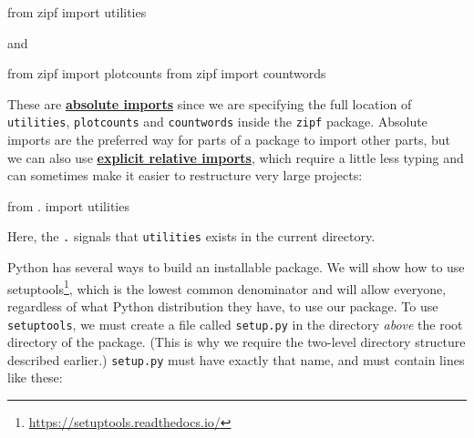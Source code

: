 \documentclass[
]{krantz}
\makeatletter
\newenvironment{Shaded}{\begin{snugshade}}{\end{snugshade}}
\newcommand{\ImportTok}[1]{#1}
\newcommand{\NormalTok}[1]{#1}
\renewcommand{\href}[2]{#2\footnote{\url{#1}}}
\newenvironment{kframe}{%
\medskip{}
\setlength{\fboxsep}{.8em}
 \def\at@end@of@kframe{}%
 \ifinner\ifhmode%
  \def\at@end@of@kframe{\end{minipage}}%
  \begin{minipage}{\columnwidth}%
 \fi\fi%
 \def\FrameCommand##1{\hskip\@totalleftmargin \hskip-\fboxsep
 \colorbox{shadecolor}{##1}\hskip-\fboxsep
     \hskip-\linewidth \hskip-\@totalleftmargin \hskip\columnwidth}%
 \MakeFramed {\advance\hsize-\width
   \@totalleftmargin\z@ \linewidth\hsize
   \@setminipage}}%
 {\par\unskip\endMakeFramed%
 \at@end@of@kframe}
\renewenvironment{Shaded}{\begin{kframe}}{\end{kframe}}
\newcommand{\gref}[2]{\hyperlink{#2}{\textbf{#1}}}
\makeatother
\begin{document}
\begin{Shaded}
\begin{Highlighting}[]
\ImportTok{from}\NormalTok{ zipf }\ImportTok{import}\NormalTok{ utilities}
\end{Highlighting}
\end{Shaded}

and

\begin{Shaded}
\begin{Highlighting}[]
\ImportTok{from}\NormalTok{ zipf }\ImportTok{import}\NormalTok{ plotcounts}
\ImportTok{from}\NormalTok{ zipf }\ImportTok{import}\NormalTok{ countwords}
\end{Highlighting}
\end{Shaded}

These are \gref{absolute imports}{absolute\_import}
since we are specifying the full location of \texttt{utilities}, \texttt{plotcounts} and \texttt{countwords}
inside the \texttt{zipf} package.
Absolute imports are the preferred way for parts of a package to import other parts,
but we can also use
\gref{explicit relative imports}{explicit\_relative\_import},
which require a little less typing
and can sometimes make it easier to restructure very large projects:

\begin{Shaded}
\begin{Highlighting}[]
\ImportTok{from}\NormalTok{ . }\ImportTok{import}\NormalTok{ utilities}
\end{Highlighting}
\end{Shaded}

Here,
the \texttt{.} signals that \texttt{utilities} exists in the current directory.

Python has several ways to build an installable package.
We will show how to use \href{https://setuptools.readthedocs.io/}{setuptools},
which is the lowest common denominator
and will allow everyone,
regardless of what Python distribution they have,
to use our package.
To use \texttt{setuptools},
we must create a file called \texttt{setup.py} in the directory \emph{above} the root directory of the package.
(This is why we require the two-level directory structure described earlier.)
\texttt{setup.py} must have exactly that name,
and must contain lines like these:
\end{document}
